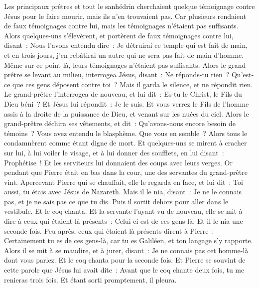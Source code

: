 \begin{multicols}{2}
Les principaux prêtres et tout le sanhédrin cherchaient quelque témoignage contre Jésus pour le faire mourir, mais ils n'en trouvaient pas.
Car plusieurs rendaient de faux témoignages contre lui, mais les témoignages n'étaient pas suffisants.
Alors quelques-uns s'élevèrent, et portèrent de faux témoignages contre lui, disant~:
Nous l'avons entendu dire~: Je détruirai ce temple qui est fait de main, et en trois jours, j'en rebâtirai un autre qui ne sera pas fait de main d'homme.
Même sur ce point-là, leurs témoignages n'étaient pas suffisants.
Alors le grand-prêtre se levant au milieu, interrogea Jésus, disant~: Ne réponds-tu rien~? Qu'est-ce que ces gens déposent contre toi~?
Mais il garda le silence, et ne répondit rien. Le grand-prêtre l'interrogea de nouveau, et lui dit~: Es-tu le Christ, le Fils du Dieu béni~?
Et Jésus lui répondit~: Je le suis. Et vous verrez le Fils de l'homme assis à la droite de la puissance de Dieu, et venant sur les nuées du ciel.
Alors le grand-prêtre déchira ses vêtements, et dit~: Qu'avons-nous encore besoin de témoins~?
Vous avez entendu le blasphème. Que vous en semble~? Alors tous le condamnèrent comme étant digne de mort.
Et quelques-uns se mirent à cracher sur lui, à lui voiler le visage, et à lui donner des soufflets, en lui disant~: Prophétise~! Et les serviteurs lui donnaient des coups avec leurs verges.
Or pendant que Pierre était en bas dans la cour, une des servantes du grand-prêtre vint.
Apercevant Pierre qui se chauffait, elle le regarda en face, et lui dit~: Toi aussi, tu étais avec Jésus de Nazareth.
Mais il le nia, disant~: Je ne le connais pas, et je ne sais pas ce que tu dis. Puis il sortit dehors pour aller dans le vestibule. Et le coq chanta.
Et la servante l'ayant vu de nouveau, elle se mit à dire à ceux qui étaient là présents~: Celui-ci est de ces gens-là. Et il le nia une seconde fois.
Peu après, ceux qui étaient là présents dirent à Pierre~: Certainement tu es de ces gens-là, car tu es Galiléen, et ton langage s'y rapporte.
Alors il se mit à se maudire, et à jurer, disant~: Je ne connais pas cet homme-là dont vous parlez.
Et le coq chanta pour la seconde fois. Et Pierre se souvint de cette parole que Jésus lui avait dite~: Avant que le coq chante deux fois, tu me renieras trois fois. Et étant sorti promptement, il pleura.

\end{multicols}
